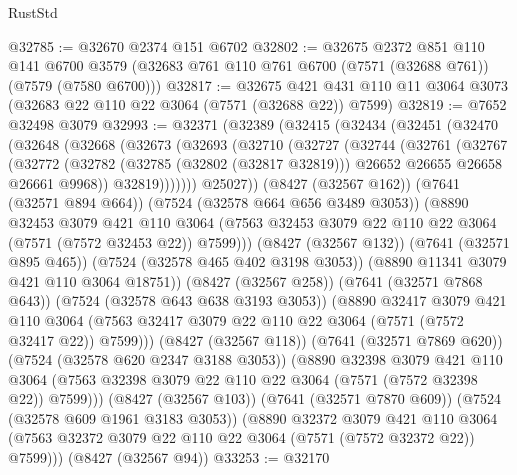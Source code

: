 \begin{lexlean}{RustStd}
\begin{coremodule}
{\begin{coremodule}
{{{{{{{{{{{{{{{{{{{{{{{{{{{{{{{{@32785 := @32670 @2374 @151 @6702
@32802 := @32675
    @2372
    @851
    @110
    @141
    @6700
    @3579
    (@32683 @761 @110 @761 @6700 (@7571 (@32688 @761)) (@7579 (@7580 @6700)))
@32817 := @32675
    @421
    @431
    @110
    @11
    @3064
    @3073
    (@32683 @22 @110 @22 @3064 (@7571 (@32688 @22)) @7599)
@32819 := @7652 @32498 @3079
@32993 := @32371
    (@32389
      (@32415
        (@32434
          (@32451
            (@32470
              (@32648
                (@32668
                  (@32673
                    (@32693
                      (@32710
                        (@32727
                          (@32744
                            (@32761
                              (@32767
                                (@32772
                                  (@32782
                                    (@32785 (@32802 (@32817 @32819)))
                                    @26652
                                    @26655
                                    @26658
                                    @26661
                                    @9968))
                                @32819)))))))
                  @25027))
              (@8427 (@32567 @162))
              (@7641 (@32571 @894 @664))
              (@7524 (@32578 @664 @656 @3489 @3053))
              (@8890
                @32453
                @3079
                @421
                @110
                @3064
                (@7563 @32453 @3079 @22 @110 @22 @3064 (@7571 (@7572 @32453 @22)) @7599)))
            (@8427 (@32567 @132))
            (@7641 (@32571 @895 @465))
            (@7524 (@32578 @465 @402 @3198 @3053))
            (@8890 @11341 @3079 @421 @110 @3064 @18751))
          (@8427 (@32567 @258))
          (@7641 (@32571 @7868 @643))
          (@7524 (@32578 @643 @638 @3193 @3053))
          (@8890
            @32417
            @3079
            @421
            @110
            @3064
            (@7563 @32417 @3079 @22 @110 @22 @3064 (@7571 (@7572 @32417 @22)) @7599)))
        (@8427 (@32567 @118))
        (@7641 (@32571 @7869 @620))
        (@7524 (@32578 @620 @2347 @3188 @3053))
        (@8890
          @32398
          @3079
          @421
          @110
          @3064
          (@7563 @32398 @3079 @22 @110 @22 @3064 (@7571 (@7572 @32398 @22)) @7599)))
      (@8427 (@32567 @103))
      (@7641 (@32571 @7870 @609))
      (@7524 (@32578 @609 @1961 @3183 @3053))
      (@8890
        @32372
        @3079
        @421
        @110
        @3064
        (@7563 @32372 @3079 @22 @110 @22 @3064 (@7571 (@7572 @32372 @22)) @7599)))
    (@8427 (@32567 @94))
@33253 := @32170
}}}}}}}}}}}}}}}}}}}}}}}}}}}}}}}}
\end{coremodule}}
\end{coremodule}
\end{lexlean}
